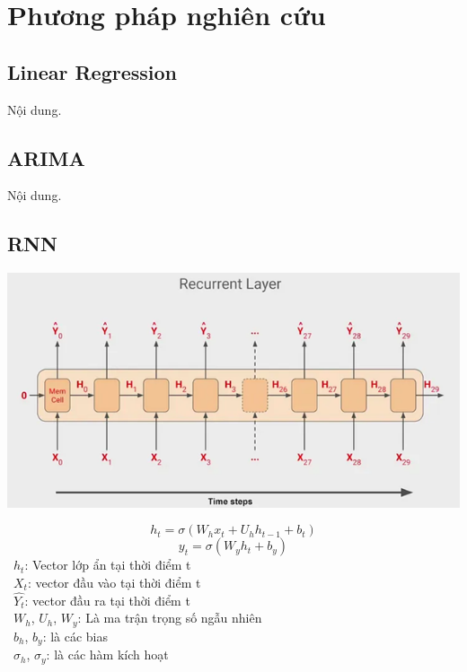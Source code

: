 \section{Phương pháp nghiên cứu}
\subsection{Linear Regression}
Nội dung.

\subsection{ARIMA}
Nội dung.
\subsection{RNN}
\begin{minipage}{0.45\textwidth}
\centering
\includegraphics[width=1\textwidth]{resources/chapter-4/rnn-1.png}
\end{minipage}
\[h_t = \sigma (W_{h}x_{t} + U_h h_{t-1} + b_t) \]
\[y_t = \sigma (W_{y} h_t + b_y)\]
    \indent\textbullet\ \(h_t\): Vector lớp ẩn tại thời điểm t\\
    \indent\textbullet\ \(X_t\): vector đầu vào tại thời điểm t\\
    \indent\textbullet\ \(\widehat{Y_t}\): vector đầu ra tại thời điểm t\\
    \indent\textbullet\ \(W_h\), \(U_h\), \(W_y\): Là ma trận trọng số ngẫu nhiên\\
    \indent\textbullet\ \(b_h\), \(b_y\): là các bias\\
    \indent\textbullet\ \(\sigma_h\), \(\sigma_y\): là các hàm kích hoạt\\

